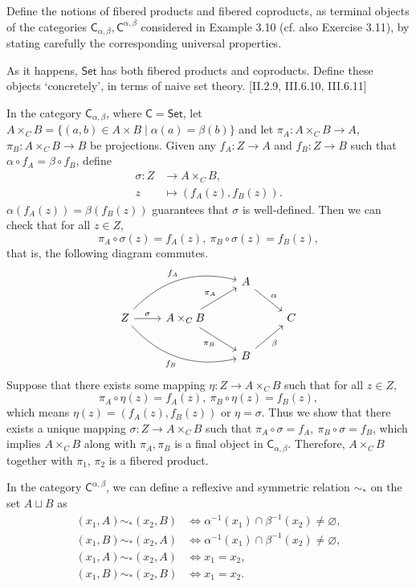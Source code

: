 \documentclass[12pt,letterpaper,boxed]{hmcpset}
\newcommand{\Set}{\mathsf{Set}}
\begin{document}
\begin{problem}[5.12]
	Define the notions of fibered products and fibered coproducts, as terminal objects of the categories $\mathsf{C}_{\alpha,\beta},\mathsf{C}^{\alpha,\beta}$ considered in
	Example 3.10 (cf. also Exercise 3.11), by stating carefully the corresponding
	universal properties.
	
	As it happens, $\Set$ has both fibered products and coproducts. Define these
	objects `concretely', in terms of naive set theory. [II.2.9, III.6.10, III.6.11]
\end{problem}
\begin{solution}
	In the category $\mathsf{C}_{\alpha,\beta}$, where $\mathsf{C} = \mathsf{Set}$, let $A\times_C B=\{(a,b)\in A\times B\mid\alpha(a)=\beta(b)\}$ and let $\pi_A:A\times_C B\to A$, $\pi_B:A\times_C B\to B$ be projections. Given any $f_A:Z\to A$ and $f_B:Z\to B$ such that $\alpha\circ f_A=\beta\circ f_B$, define
	\[
	\begin{aligned}
	\sigma:Z&\longrightarrow A\times_C B, \\  
	z&\longmapsto (f_A(z),f_B(z)).
	\end{aligned}
	\]
	$\alpha(f_A(z))=\beta(f_B(z))$ guarantees that $\sigma$ is well-defined. Then we can check that for all $z\in Z$,
	\[
	\pi_A\circ\sigma(z)=f_A(z),\ \pi_B\circ\sigma(z)=f_B(z),
	\]
	that is, the following diagram commutes.
	\[\begin{tikzcd}
	&& A\arrow[dr,"\alpha"]&\\
	Z\arrow[r,"\sigma"]\arrow[urr,bend left,"f_A"]\arrow[drr,bend right,swap,"f_B"]
	&A\times_C B\arrow[ur,"\pi_A"]\arrow[dr,swap,"\pi_B"]&&C \\
	&& B\arrow[ur,swap,"\beta"]&
	\end{tikzcd}\]
	Suppose that there exists some mapping $\eta:Z\to A\times_C B$ such that for all $z\in Z$,
	\[
	\pi_A\circ\eta(z)=f_A(z),\ \pi_B\circ\eta(z)=f_B(z),
	\]
	which means $\eta(z)=(f_A(z),f_B(z))$ or $\eta=\sigma$. Thus we show that there exists a unique mapping $\sigma:Z\to A\times_C B$ such that $\pi_A\circ\sigma=f_A,\ \pi_B\circ\sigma=f_B$, which implies $A\times_C B$ along with $\pi_A,\pi_B$ is a final object in $\mathsf{C}_{\alpha,\beta}$. Therefore, $A\times_C B$ together with $\pi_1$, $\pi_2$ is a fibered product.
	
	In the category $\mathsf{C}^{\alpha,\beta}$, we can define a reflexive and symmetric relation $\sim_*$ on the set $A\sqcup B$ as
	\begin{align*}
	(x_1,A)\sim_* (x_2,B)&\iff \alpha^{-1}(x_1)\cap\beta^{-1}(x_2)\ne\varnothing,\\
	(x_1,B)\sim_* (x_2,A)&\iff \alpha^{-1}(x_1)\cap\beta^{-1}(x_2)\ne\varnothing,\\
	(x_1,A)\sim_*(x_2,A)&\iff x_1=x_2,\\
	(x_1,B)\sim_*(x_2,B)&\iff x_1=x_2.
	\end{align*}


\end{solution}
\end{document}
